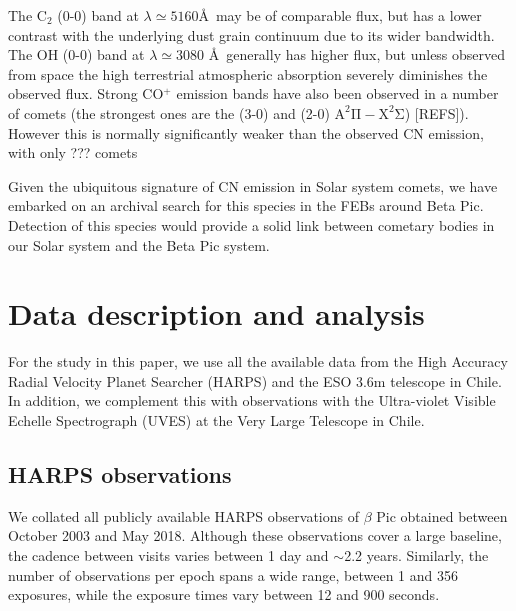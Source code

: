 \documentclass{aa}
\begin{document}
The C$_2$ (0-0) band at $\lambda\simeq 5160$\AA \ may be of comparable flux, but has a lower contrast with the underlying dust grain continuum due to its wider bandwidth. The OH (0-0) band at $\lambda\simeq 3080$ \AA \ generally has higher flux, but unless observed from space the high terrestrial atmospheric absorption severely diminishes the observed flux. Strong CO$^+$ emission bands have also been observed in a number of comets (the strongest ones are the (3-0) and (2-0) $\mathrm{A^2\Pi-X^2\Sigma}$) [REFS]). However this is normally significantly weaker than the observed CN emission, with only ??? comets 

Given the ubiquitous signature of CN emission in Solar system comets, we have embarked on an archival search for this species in the FEBs around Beta Pic. Detection of this species would provide a solid link between cometary bodies in our Solar system and the Beta Pic system.

\section{Data description and analysis}
For the study in this paper, we use all the available data from the High Accuracy Radial Velocity Planet Searcher (HARPS) and the ESO 3.6m telescope in Chile. In addition, we complement this with observations with the Ultra-violet Visible Echelle Spectrograph (UVES) at the Very Large Telescope in Chile. 

\subsection{HARPS observations}
We collated all publicly available HARPS observations of $\beta$ Pic obtained between October 2003 and May 2018. Although these observations cover a large baseline, the cadence between visits varies between 1 day and $\sim$2.2 years. Similarly, the number of observations per epoch spans a wide range, between 1 and 356 exposures, while the exposure times vary between 12 and 900 seconds. 
\end{document}
